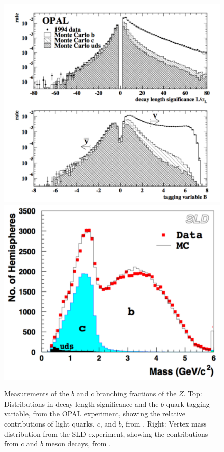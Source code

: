 \documentclass[12pt]{article}
\begin{document}
\begin{figure}
\begin{center}
\includegraphics[width=0.83\hsize]{bvertex.pdf}\\
\includegraphics[width=0.60\hsize]{bvertex2.pdf}
\end{center}
\caption{Measurements of the $b$ and $c$ branching fractions of the
  $Z$.  Top:  Distributions in decay length significance and the $b$
  quark tagging variable,  from the OPAL experiment,
  showing the relative contributions of light quarks, $c$, and $b$,
  from \cite{OPALb}.  Right: Vertex mass distribution from the SLD
  experiment, showing the contributions from $c$ and $b$ meson decays,
  from \cite{SLDbc}. }
\label{fig:bvertex}
\end{figure}
\end{document}
